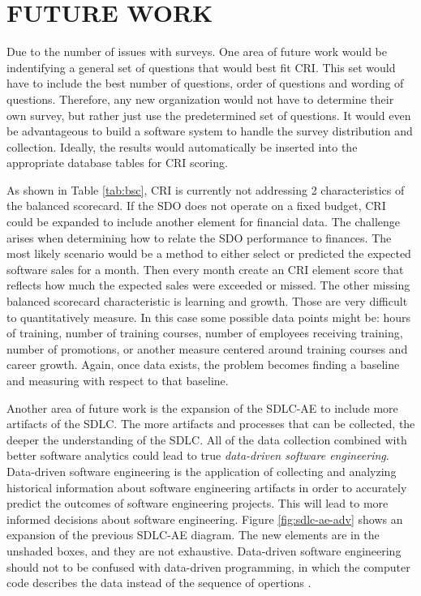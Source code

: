 \documentclass[SDSUThesis.tex]{subfiles}
\begin{document}
\section{FUTURE WORK}

    Due to the number of issues with surveys.  One area of future work would be indentifying
    a general set of questions that would best fit CRI.  This set would have to include
    the best number of questions, order of questions and wording of questions.  Therefore,
    any new organization would not have to determine their own survey, but rather just use the
    predetermined set of questions.  It would even be advantageous to build a software system to
    handle the survey distribution and collection.  Ideally, the results would automatically be
    inserted into the appropriate database tables for CRI scoring. 
    
    As shown in Table \ref{tab:bsc}, CRI is currently not addressing 2 
    characteristics of the balanced scorecard.  If the SDO does not operate 
    on a fixed budget, CRI could be 
    expanded to include another element for financial data. The challenge arises when
    determining how to relate the SDO performance to finances.  The most likely scenario
    would be a method to either select or predicted the expected software sales
    for a month.  Then every month create an CRI element score that reflects
    how much the expected sales were exceeded or missed.  The other missing
    balanced scorecard characteristic is learning and growth.  Those are very difficult
    to quantitatively measure.  In this case some possible data points might be:
    hours of training, number of training courses, number of employees receiving
    training, number of promotions, or another measure centered around training
    courses and career growth.  Again, once data exists, the problem becomes finding
    a baseline and measuring with respect to that baseline.

    Another area of future work is the expansion of the SDLC-AE to include
    more artifacts of the SDLC.  The more artifacts and processes that can
    be collected, the deeper the understanding of the SDLC.  
    All of the data collection combined with better software analytics
    could lead to true \textit{data-driven software engineering}. Data-driven
    software engineering is the application of collecting and analyzing historical
    information about software engineering artifacts in order to
    accurately predict the outcomes of software engineering projects. This
    will lead to more informed decisions about software engineering.  Figure
    \ref{fig:sdlc-ae-adv} shows an expansion of the previous SDLC-AE diagram.  
    The new elements are in the unshaded boxes, and they are not exhaustive.
    Data-driven software engineering should 
    not to be confused with data-driven programming, in which the computer code
    describes the data instead of the sequence of opertions \cite{DDP2015}.
    
\end{document}
